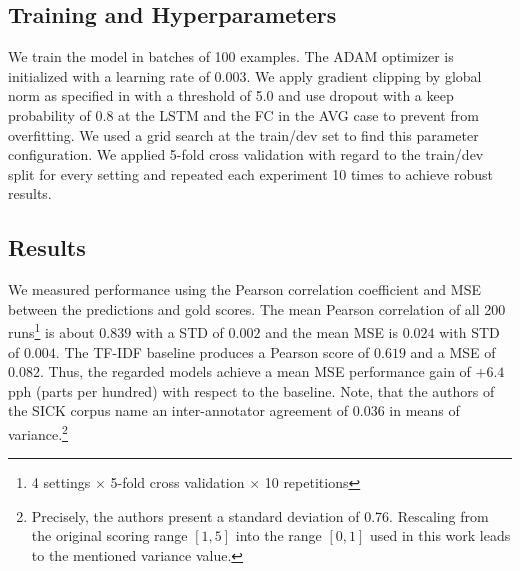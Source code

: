 

\subsection{Training and Hyperparameters}
We train the model in batches of 100 examples. The ADAM optimizer is initialized with a learning rate of 0.003. We apply gradient clipping by global norm as specified in \textcite{pascanu_difficulty_2012} with a threshold of 5.0 and use dropout \autocite{srivastava_dropout_2014} with a keep probability of 0.8 at the \ac{LSTM} and the \ac{FC} in the \ac{AVG} case to prevent from overfitting. We used a grid search at the train/dev set to find this parameter configuration. We applied 5-fold cross validation with regard to the train/dev split for every setting and repeated each experiment 10 times to achieve robust results.

\subsection{Results}
We measured performance using the Pearson correlation coefficient and \ac{MSE} between the predictions and gold scores. The mean Pearson correlation of all 200 runs\footnote{4 settings $\times$ 5-fold cross validation $\times$ 10 repetitions} is about $0.839$ %
with a \ac{STD} of $0.002$ and the mean \ac{MSE} is $0.024$ with \ac{STD} of $0.004$. The \ac{TF-IDF} baseline produces a Pearson score of $0.619$ and a \ac{MSE} of $0.082$. Thus, the regarded models achieve a mean \ac{MSE} performance gain of $+6.4$ pph (parts per hundred) with respect to the baseline. Note, that the authors of the SICK corpus name an inter-annotator agreement of 0.036 in means of variance.\footnote{Precisely, the authors present a standard deviation of 0.76. Rescaling from the original scoring range $[1, 5]$ into the range $[0, 1]$ used in this work leads to the mentioned variance value.} 

